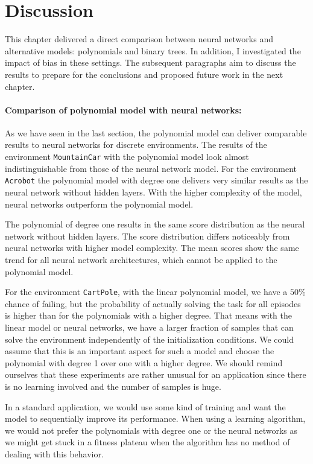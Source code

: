 \clearpage
\section{Discussion}
This chapter delivered a direct comparison between neural networks and alternative models: polynomials and binary trees. In addition, I investigated the impact of bias in these settings. The subsequent paragraphs aim to discuss the results to prepare for the conclusions and proposed future work in the next chapter.

\paragraph*{Comparison of polynomial model with neural networks:} As we have seen in the last section, the polynomial model can deliver comparable results to neural networks for discrete environments. The results of the environment \texttt{MountainCar} with the polynomial model look almost indistinguishable from those of the neural network model. For the environment \texttt{Acrobot} the polynomial model with degree one delivers very similar results as the neural network without hidden layers. With the higher complexity of the model, neural networks outperform the polynomial model.

The polynomial of degree one results in the same score distribution as the neural network without hidden layers. The score distribution differs noticeably from neural networks with higher model complexity. The mean scores show the same trend for all neural network architectures, which cannot be applied to the polynomial model.

For the environment \verb|CartPole|, with the linear polynomial model, we have a $50 \%$ chance of failing, but the probability of actually solving the task for all episodes is higher than for the polynomials with a higher degree. That means with the linear model or neural networks, we have a larger fraction of samples that can solve the environment independently of the initialization conditions. We could assume that this is an important aspect for such a model and choose the polynomial with degree 1 over one with a higher degree. We should remind ourselves that these experiments are rather unusual for an application since there is no learning involved and the number of samples is huge.

In a standard application, we would use some kind of training and want the model to sequentially improve its performance. When using a learning algorithm, we would not prefer the polynomials with degree one or the neural networks as we might get stuck in a fitness plateau when the algorithm has no method of dealing with this behavior.

